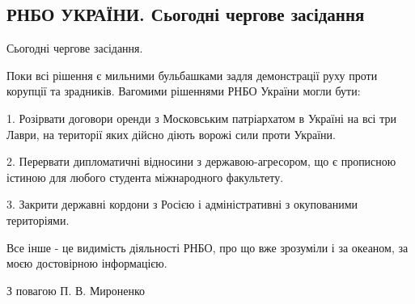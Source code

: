  
 
 
 
 

\subsection{РНБО УКРАЇНИ.  Сьогодні чергове засідання}

Сьогодні чергове засідання.

Поки всі рішення є мильними бульбашками задля демонстрації руху проти корупції
та зрадників.  Вагомими рішеннями РНБО України могли бути:

1. Розірвати договори оренди з Московським патріархатом в Україні на всі три Лаври, на території яких дійсно діють ворожі сили проти України.

2. Перервати дипломатичні відносини з державою-агресором, що є прописною істиною для любого студента міжнародного факультету.

3. Закрити державні кордони з Росією і адміністративні з окупованими територіями.

Все інше - це видимість діяльності РНБО, про що вже зрозуміли і за океаном, за
моєю достовірною інформацією.

З повагою П. В. Мироненко
